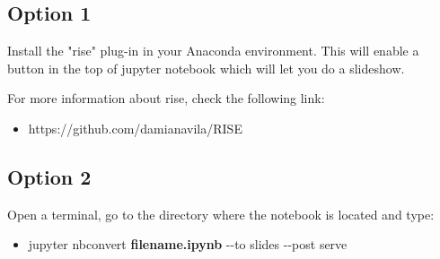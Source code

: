 \documentclass[11pt]{article}
\providecommand{\tightlist}{%
      \setlength{\itemsep}{0pt}\setlength{\parskip}{0pt}}
\begin{document}
    \subsection{Option 1}\label{option-1}

Install the "rise" plug-in in your Anaconda environment. This will
enable a button in the top of jupyter notebook which will let you do a
slideshow.

For more information about rise, check the following link:

\begin{itemize}
\tightlist
\item
  https://github.com/damianavila/RISE
\end{itemize}

    \subsection{Option 2}\label{option-2}

Open a terminal, go to the directory where the notebook is located and
type:

\begin{itemize}
\tightlist
\item
  jupyter nbconvert \textbf{filename.ipynb} -\/-to slides -\/-post serve
\end{itemize}


    
    
    
    
\end{document}
